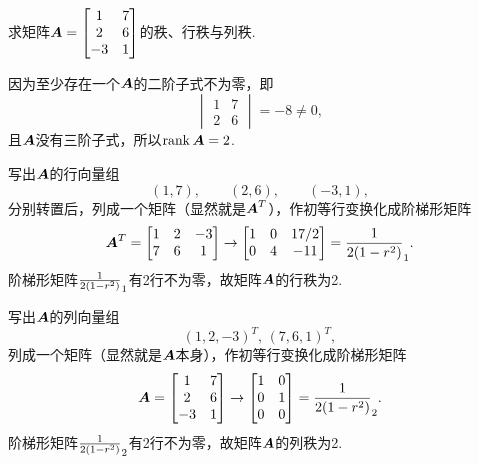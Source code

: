 \begin{example}
求矩阵\(\boldsymbol{A} = \begin{bmatrix} 1 & 7 \\ 2 & 6 \\ -3 & 1 \end{bmatrix}\)的秩、行秩与列秩.
\begin{solution}
因为至少存在一个\(\boldsymbol{A}\)的二阶子式不为零，即\[
\begin{vmatrix} 1 & 7 \\ 2 & 6 \end{vmatrix} = -8 \neq 0,
\]且\(\boldsymbol{A}\)没有三阶子式，所以\(\rank\boldsymbol{A} = 2\).

写出\(\boldsymbol{A}\)的行向量组\[
(1,7), \qquad
(2,6), \qquad
(-3,1),
\]分别转置后，列成一个矩阵（显然就是\(\boldsymbol{A}^T\)），作初等行变换化成阶梯形矩阵\[
\boldsymbol{A}^T = \begin{bmatrix}
1 & 2 & -3 \\
7 & 6 & 1
\end{bmatrix} \to \begin{bmatrix}
1 & 0 & 17/2 \\
0 & 4 & -11
\end{bmatrix} = \frac{1}{2(1-r^2)}_1.
\]阶梯形矩阵\(\frac{1}{2(1-r^2)}_1\)有2行不为零，故矩阵\(\boldsymbol{A}\)的行秩为2.

写出\(\boldsymbol{A}\)的列向量组\[
(1,2,-3)^T,\,(7,6,1)^T,
\]列成一个矩阵（显然就是\(\boldsymbol{A}\)本身），作初等行变换化成阶梯形矩阵\[
\boldsymbol{A} = \begin{bmatrix} 1 & 7 \\ 2 & 6 \\ -3 & 1 \end{bmatrix}
\to \begin{bmatrix} 1 & 0 \\ 0 & 1 \\ 0 & 0 \end{bmatrix} = \frac{1}{2(1-r^2)}_2.
\]阶梯形矩阵\(\frac{1}{2(1-r^2)}_2\)有2行不为零，故矩阵\(\boldsymbol{A}\)的列秩为2.
\end{solution}
\end{example}

